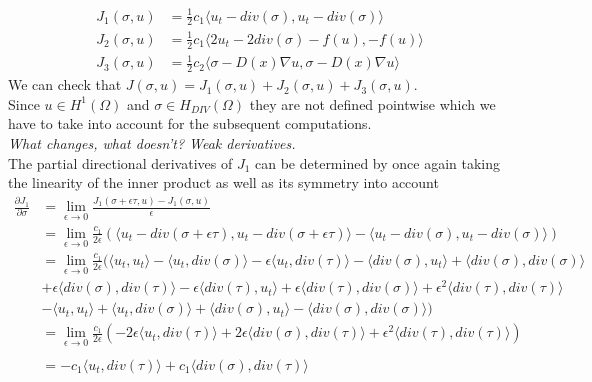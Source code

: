 \documentclass[../draft_1.tex]{subfiles}
\begin{document}
\begin{equation}
\begin{aligned}
J_1(\sigma, u) &= \frac{1}{2}c_1\langle u_t - div(\sigma), u_t - div(\sigma) \rangle \\
J_2(\sigma, u) &= \frac{1}{2} c_1 \langle 2 u_t - 2 div(\sigma) - f(u), - f(u) \rangle \\
J_3(\sigma, u) &= \frac{1}{2} c_2\langle \sigma - D(x) \nabla u, \sigma  - D(x) \nabla u \rangle
\end{aligned}
\end{equation}
We can check that $J(\sigma, u) = J_1(\sigma, u) + J_2(\sigma, u) + J_3(\sigma, u)$. 
\smallskip
\\
Since $u \in H^1(\Omega)$ and $\sigma \in H_{DIV}(\Omega)$ they are not defined pointwise which we have to take into account for the subsequent computations.
\smallskip
\\
\textit{What changes, what doesn't? Weak derivatives.}
\smallskip
\\
The partial directional derivatives of $J_1$ can be determined by once again taking the linearity of the inner product as well as its symmetry into account
\begin{equation}
\begin{aligned}
\frac{\partial J_1}{\partial \sigma} &= \lim_{\epsilon \rightarrow 0} \frac{J_1(\sigma + \epsilon \tau, u) - J_1(\sigma, u)}{\epsilon}  \\ 
&= \lim_{\epsilon \rightarrow 0} \frac{c_1}{2 \epsilon} (\langle u_t - div(\sigma + \epsilon \tau), u_t - div(\sigma + \epsilon \tau) \rangle - \langle u_t - div(\sigma), u_t - div(\sigma) \rangle) \\
&=  \lim_{\epsilon \rightarrow 0} \frac{c_1}{2 \epsilon} (\langle u_t, u_t \rangle - \langle u_t, div(\sigma) \rangle - \epsilon \langle u_t, div(\tau) \rangle - \langle div(\sigma), u_t \rangle + \langle div(\sigma), div(\sigma) \rangle \\ &+ \epsilon \langle div(\sigma), div(\tau) \rangle - \epsilon \langle div(\tau), u_t \rangle + \epsilon \langle div(\tau), div(\sigma) \rangle + \epsilon^2 \langle div(\tau), div(\tau) \rangle \\
& - \langle u_t, u_t \rangle + \langle u_t, div(\sigma) \rangle + \langle div(\sigma), u_t \rangle - \langle div(\sigma), div(\sigma) \rangle) \\
&= \lim_{\epsilon \rightarrow 0} \frac{c_1}{2 \epsilon} (- 2 \epsilon \langle u_t, div(\tau) \rangle + 2 \epsilon \langle div(\sigma), div(\tau) \rangle + \epsilon^2 \langle div(\tau), div(\tau) \rangle )
\\
\\
&= - c_1 \langle u_t, div(\tau) \rangle + c_1 \langle div(\sigma), div(\tau) \rangle
\end{aligned}
\end{equation}
\end{document}
